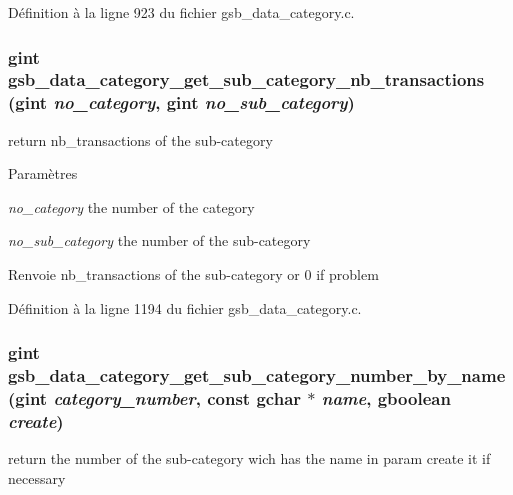 Définition à la ligne 923 du fichier gsb\_\-data\_\-category.c.

\subsubsection[{gsb\_\-data\_\-category\_\-get\_\-sub\_\-category\_\-nb\_\-transactions}]{\setlength{\rightskip}{0pt plus 5cm}gint gsb\_\-data\_\-category\_\-get\_\-sub\_\-category\_\-nb\_\-transactions (gint {\em no\_\-category}, \/  gint {\em no\_\-sub\_\-category})}\label{gsb__data__category_8h_a5f16d58b41f4b4278206b7a1e060989f}
return nb\_\-transactions of the sub-\/category


\begin{DoxyParams}{Paramètres}
\item[{\em no\_\-category}]the number of the category \item[{\em no\_\-sub\_\-category}]the number of the sub-\/category\end{DoxyParams}
\begin{DoxyReturn}{Renvoie}
nb\_\-transactions of the sub-\/category or 0 if problem 
\end{DoxyReturn}


Définition à la ligne 1194 du fichier gsb\_\-data\_\-category.c.

\subsubsection[{gsb\_\-data\_\-category\_\-get\_\-sub\_\-category\_\-number\_\-by\_\-name}]{\setlength{\rightskip}{0pt plus 5cm}gint gsb\_\-data\_\-category\_\-get\_\-sub\_\-category\_\-number\_\-by\_\-name (gint {\em category\_\-number}, \/  const gchar $\ast$ {\em name}, \/  gboolean {\em create})}\label{gsb__data__category_8h_ae7a9bf73192580090b2d710ec5a1c0f9}
return the number of the sub-\/category wich has the name in param create it if necessary


